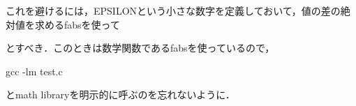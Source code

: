 \documentclass{article}
\begin{document}
\begin{maplegroup}
\begin{Maple Normal}{
これを避けるには，EPSILONという小さな数字を定義しておいて，値の差の絶対値を求めるfabsを使って}\end{Maple Normal}

\end{maplegroup}
\begin{maplegroup}
\begin{Maple Normal}{
とすべき．このときは数学関数であるfabsを使っているので，}\end{Maple Normal}

\begin{Maple Normal}{
gcc -lm test.c}\end{Maple Normal}

\begin{Maple Normal}{
とmath libraryを明示的に呼ぶのを忘れないように．}\end{Maple Normal}
\end{maplegroup}
\end{document}
